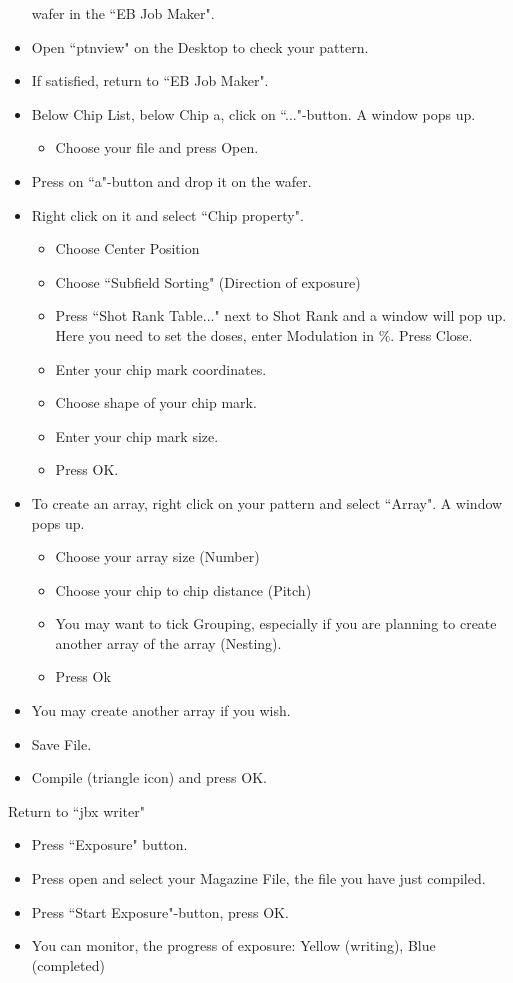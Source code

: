 \begin{itemize}
  wafer in the ``EB Job Maker".
\item Open ``ptnview" on the Desktop to check your pattern.
\item If satisfied, return to ``EB Job Maker".
\item  Below Chip  List, below  Chip  a, click  on ``..."-button.   A
  window pops up.
  \begin{itemize}
  \item Choose your file and press Open.
  \end{itemize}
\item Press on ``a"-button and drop it on the wafer.
\item Right click on it and select ``Chip property".
  \begin{itemize}
  \item Choose Center Position
  \item Choose ``Subfield Sorting" (Direction of exposure)
  \item Press ``Shot  Rank Table..."  next to Shot Rank  and a window
    will pop up.  Here you need to set the doses, enter Modulation in
    $\%$. Press Close.
  \item Enter your chip mark coordinates.
  \item Choose shape of your chip mark.
  \item Enter your chip mark size.
  \item Press OK.
  \end{itemize}
\item To  create an  array, right  click on  your pattern  and select
  ``Array". A window pops up.
  \begin{itemize}
  \item Choose your array size (Number)
  \item Choose your chip to chip distance (Pitch)
  \item You may want to tick Grouping, especially if you are planning
    to create another array of the array (Nesting).
  \item Press Ok
  \end{itemize}
\item You may create another array if you wish.
\item Save File.
\item Compile (triangle icon) and press OK.
\end{itemize}
Return to ``jbx writer"
\begin{itemize}
\item Press ``Exposure" button.
\item Press  open and select  your Magazine  File, the file  you have
  just compiled.
\item Press ``Start Exposure"-button, press OK.
\item You  can monitor, the  progress of exposure:  Yellow (writing),
  Blue (completed)
\end{itemize}

